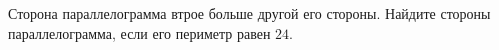 \begin{ex}
	\begin{condition}
		Сторона параллелограмма втрое больше другой его стороны. Найдите стороны параллелограмма, если его периметр равен \( 24 \).
	\end{condition}
\end{ex}